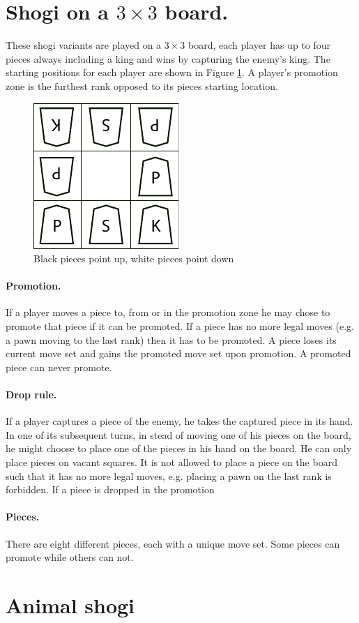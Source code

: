 \documentclass{article}
\begin{document}
{\appendix
\section{Shogi on a $3 \times 3$ board.}
\label{3x3rules}
These shogi variants are played on a $3 \times 3$ board, each player has up to four pieces always including a king and wins by capturing the enemy's king.
The starting positions for each player are shown in Figure \ref{startingpos}. A player's promotion zone is the furthest rank opposed to its pieces starting location.
\begin{figure}[h]
\center
\includegraphics{smallsetup.pdf}
\caption{Black pieces point up, white pieces point down}
\label{startingpos}
\end{figure}

\paragraph{Promotion.} If a player moves a piece to, from or in the promotion zone he may chose to promote that piece if it can be promoted. If a piece has no more legal moves
(e.g. a pawn moving to the last rank) then it has to be promoted. A piece loses its current move set and gains the promoted move set upon promotion. A promoted piece can never
promote.

\paragraph{Drop rule.} If a player captures a piece of the enemy, he takes the captured piece in its hand. In one of its subsequent turns, in stead of moving one of his
pieces on the board, he might choose to place one of the pieces in his hand on the board. He can only place pieces on vacant squares. It is not allowed to place a piece
on the board such that it has no more legal moves, e.g. placing a pawn on the last rank is forbidden. If a piece is dropped in the promotion

\paragraph{Pieces.} There are eight different pieces, each with a unique move set. Some pieces can promote while others can not.



\section{Animal shogi}
\label{dobutsu}
}
{}

\end{document}
